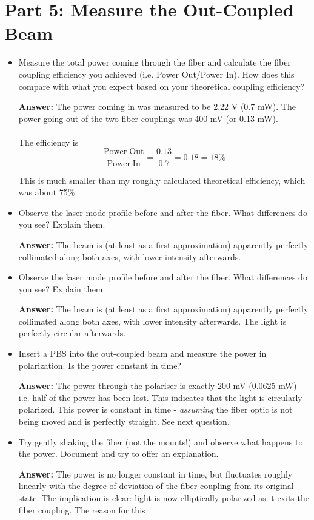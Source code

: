 \documentclass[10pt,a4paper]{article}
\begin{document}
\section*{Part 5: Measure the Out-Coupled Beam}
\begin{itemize}
\item Measure the total power coming through the fiber and calculate the fiber coupling efficiency you achieved (i.e. Power Out/Power In). How does this compare with what you expect based on your theoretical coupling efficiency?

\textbf{Answer: } The power coming in was measured to be 2.22 V (0.7 mW). The power going out of the two fiber couplings was 400 mV (or 0.13 mW). \\
\\
The efficiency is 
$$ \dfrac{\mathrm{Power\; Out}}{\mathrm{Power\; In}} = \dfrac{0.13}{0.7} = 0.18 = 18 \%$$

This is much smaller than my roughly calculated theoretical efficiency, which was about 75\%.

\item Observe the laser mode profile before and after the fiber. What differences do you see? Explain them.

\textbf{Answer: } The beam is (at least as a first approximation) apparently perfectly collimated along both axes, with lower intensity afterwards.

\item Observe the laser mode profile before and after the fiber. What differences do you see? Explain them.

\textbf{Answer: } The beam is (at least as a first approximation) apparently perfectly collimated along both axes, with lower intensity afterwards. The light is perfectly circular afterwards.

\item Insert a PBS into the out-coupled beam and measure the power in polarization. Is the power constant in time? 

\textbf{Answer: } The power through the polariser is exactly 200 mV (0.0625 mW) i.e. half of the power has been lost. This indicates that the light is circularly polarized. This power is constant in time - \textsl{assuming} the fiber optic is not being moved and is perfectly straight. See next question.

\item Try gently shaking the fiber (not the mounts!) and observe what happens to the power. Document and try to offer an explanation.

\textbf{Answer: }The power is no longer constant in time, but fluctuates roughly linearly with the degree of deviation of the fiber coupling from its original state. The implication is clear: light  is now elliptically polarized as it exits the fiber coupling. The reason for this 
\end{itemize}
\end{document}

